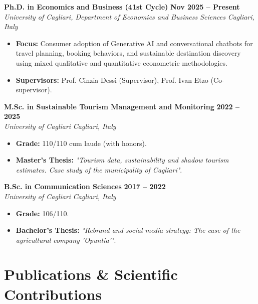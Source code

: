 \documentclass[10pt,a4paper]{article}
\begin{document}
\textbf{Ph.D. in Economics and Business (41st Cycle)} \hfill \textbf{Nov 2025 -- Present} \\
\textit{University of Cagliari, Department of Economics and Business Sciences} \hfill \textit{Cagliari, Italy}
\begin{itemize}
    \item \textbf{Focus:} Consumer adoption of Generative AI and conversational chatbots for travel planning, booking behaviors, and sustainable destination discovery using mixed qualitative and quantitative econometric methodologies.
    \item \textbf{Supervisors:} Prof. Cinzia Dessì (Supervisor), Prof. Ivan Etzo (Co-supervisor).
\end{itemize}

\vspace{3pt}
\textbf{M.Sc. in Sustainable Tourism Management and Monitoring} \hfill \textbf{2022 -- 2025} \\
\textit{University of Cagliari} \hfill \textit{Cagliari, Italy}
\begin{itemize}
    \item \textbf{Grade:} 110/110 cum laude (with honors).
    \item \textbf{Master's Thesis:} \textit{"Tourism data, sustainability and shadow tourism estimates. Case study of the municipality of Cagliari"}.
\end{itemize}

\vspace{3pt}
\textbf{B.Sc. in Communication Sciences} \hfill \textbf{2017 -- 2022} \\
\textit{University of Cagliari} \hfill \textit{Cagliari, Italy}
\begin{itemize}
    \item \textbf{Grade:} 106/110.
    \item \textbf{Bachelor's Thesis:} \textit{"Rebrand and social media strategy: The case of the agricultural company 'Opuntia'"}.
\end{itemize}

\section{Publications \& Scientific Contributions}
\end{document}
